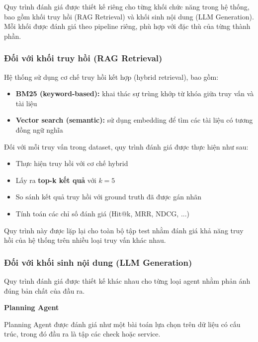 Quy trình đánh giá được thiết kế riêng cho từng khối chức năng trong hệ thống, bao gồm khối truy hồi (RAG Retrieval) và khối sinh nội dung (LLM Generation). Mỗi khối được đánh giá theo pipeline riêng, phù hợp với đặc thù của từng thành phần.

\subsubsection*{Đối với khối truy hồi (RAG Retrieval)}

Hệ thống sử dụng cơ chế truy hồi kết hợp (hybrid retrieval), bao gồm:

\begin{itemize}
    \item \textbf{BM25 (keyword-based):} khai thác sự trùng khớp từ khóa giữa truy vấn và tài liệu
    \item \textbf{Vector search (semantic):} sử dụng embedding để tìm các tài liệu có tương đồng ngữ nghĩa
\end{itemize}

Đối với mỗi truy vấn trong dataset, quy trình đánh giá được thực hiện như sau:

\begin{itemize}
    \item Thực hiện truy hồi với cơ chế hybrid
    \item Lấy ra \textbf{top-k kết quả} với $k = 5$
    \item So sánh kết quả truy hồi với ground truth đã được gán nhãn
    \item Tính toán các chỉ số đánh giá (Hit@k, MRR, NDCG, ...)
\end{itemize}

Quy trình này được lặp lại cho toàn bộ tập test nhằm đánh giá khả năng truy hồi của hệ thống trên nhiều loại truy vấn khác nhau.

\subsubsection*{Đối với khối sinh nội dung (LLM Generation)}

Quy trình đánh giá được thiết kế khác nhau cho từng loại agent nhằm phản ánh đúng bản chất của đầu ra.

\textbf{Planning Agent}

Planning Agent được đánh giá như một bài toán lựa chọn trên dữ liệu có cấu trúc, trong đó đầu ra là tập các check hoặc service.

